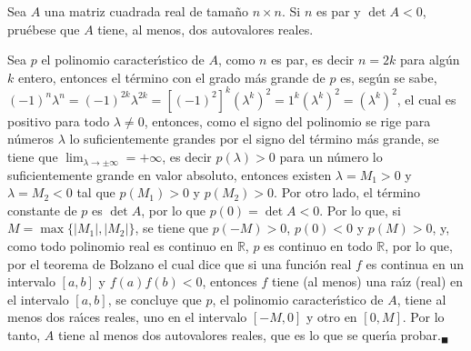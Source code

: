 \begin{enunciado}
 Sea $A$ una matriz cuadrada real de tama\~no $n \times n$. Si $n$ es par y $\det A < 0$, pru\'ebese que $A$ tiene, al menos, dos autovalores reales.
\end{enunciado}

\begin{solucion}
 Sea $p$ el polinomio caracter\'{\i}stico de $A$, como $n$ es par, es decir $n = 2k$ para alg\'un $k$ entero, entonces el t\'ermino con el grado m\'as grande de $p$ es, seg\'un se sabe, $(-1)^n\lambda^n = (-1)^{2k} \lambda^{2k} = [(-1)^{2}]^{k} (\lambda^k)^2 = 1^k (\lambda^k)^2 = (\lambda^k)^2$, el cual es positivo para todo $\lambda \neq 0$, entonces, como el signo del polinomio se rige para n\'umeros $\lambda$ lo suficientemente grandes por el signo del t\'ermino m\'as grande, se tiene que $\lim_{\lambda \to \pm \infty} = +\infty$, es decir $p(\lambda) > 0$ para un n\'umero lo suficientemente grande en valor absoluto, entonces existen $\lambda = M_1 > 0$ y $\lambda = M_2 < 0$ tal que $p(M_1) > 0$ y $p(M_2) > 0$. Por otro lado, el t\'ermino constante de $p$ es $\det A$, por lo que $p(0) = \det A < 0$. Por lo que, si $M = \max \{ |M_1|, |M_2| \}$, se tiene que $p(-M) > 0$, $p(0) < 0$ y $p(M) > 0$, y, como todo polinomio real es continuo en $\mathbb{R}$, $p$ es continuo en todo $\mathbb{R}$, por lo que, por el teorema de Bolzano el cual dice que si una funci\'on real $f$ es continua en un intervalo $[a,b]$ y $f(a)f(b) < 0$, entonces $f$ tiene (al menos) una ra\'{\i}z (real) en el intervalo $[a,b]$, se concluye que $p$, el polinomio caracter\'{\i}stico de $A$, tiene al menos dos ra\'{\i}ces reales, uno en el intervalo $[-M,0]$ y otro en $[0,M]$. Por lo tanto, $A$ tiene al menos dos autovalores reales, que es lo que se quer\'{\i}a probar.${}_{\blacksquare}$
\end{solucion}

